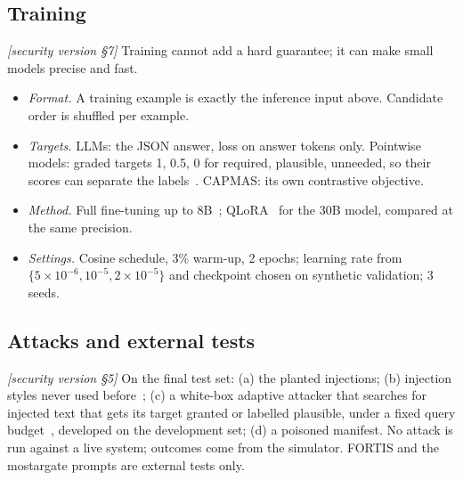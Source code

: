 \documentclass[10pt]{article}
\newcommand{\M}[1]{\textit{[security version #1]}}
\begin{document}
\subsection{Training}
\M{\S7}
Training cannot add a hard guarantee; it can make small models precise and fast.
\begin{itemize}
  \item \emph{Format.} A training example is exactly the inference input above. Candidate order is shuffled per example.
  \item \emph{Targets.} LLMs: the JSON answer, loss on answer tokens only. Pointwise models: graded targets 1, 0.5, 0 for
    required, plausible, unneeded, so their scores can separate the labels~\cite{beyondyesno}. CAPMAS: its own contrastive
    objective.
  \item \emph{Method.} Full fine-tuning up to 8B~\cite{loralearnsless}; QLoRA~\cite{qlora} for the 30B model, compared at the
    same precision.
  \item \emph{Settings.} Cosine schedule, 3\% warm-up, 2 epochs; learning rate from $\{5\!\times\!10^{-6}, 10^{-5},
    2\!\times\!10^{-5}\}$ and checkpoint chosen on synthetic validation; 3 seeds.
\end{itemize}

\subsection{Attacks and external tests}
\M{\S5}
On the final test set: (a) the planted injections; (b) injection styles never used before~\cite{injecagent,agentdojo};
(c) a white-box adaptive attacker that searches for injected text that gets its target granted or labelled plausible,
under a fixed query budget~\cite{carlini,attackersecond,pair}, developed on the development set; (d) a poisoned manifest. No
attack is run against a live system; outcomes come from the simulator. FORTIS and the mostargate prompts are external
tests only.
\end{document}
